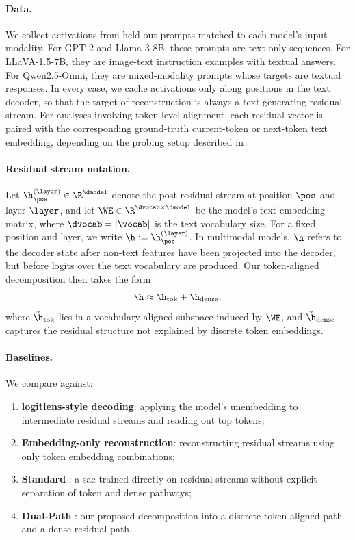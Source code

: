 \documentclass{article}
\begin{document}
\paragraph{Data.}
We collect activations from held-out prompts matched to each model's input modality. For GPT-2 and Llama-3-8B, these prompts are text-only sequences. For LLaVA-1.5-7B, they are image-text instruction examples with textual answers. For Qwen2.5-Omni, they are mixed-modality prompts whose targets are textual responses. In every case, we cache activations only along positions in the text decoder, so that the target of reconstruction is always a text-generating residual stream. For analyses involving token-level alignment, each residual vector is paired with the corresponding ground-truth current-token or next-token text embedding, depending on the probing setup described in .

\paragraph{Residual stream notation.}
Let $\h_{\pos}^{(\layer)} \in \R^{\dmodel}$ denote the post-residual stream at position $\pos$ and layer $\layer$, and let $\WE \in \R^{\dvocab \times \dmodel}$ be the model's text embedding matrix, where $\dvocab = |\vocab|$ is the text vocabulary size. For a fixed position and layer, we write $\h := \h_{\pos}^{(\layer)}$. In multimodal models, $\h$ refers to the decoder state after non-text features have been projected into the decoder, but before logits over the text vocabulary are produced. Our token-aligned decomposition then takes the form
\begin{equation}
  \h \approx \tilde{\h}_{\text{tok}} + \tilde{\h}_{\text{dense}},
\end{equation}
where $\tilde{\h}_{\text{tok}}$ lies in a vocabulary-aligned subspace induced by $\WE$, and $\tilde{\h}_{\text{dense}}$ captures the residual structure not explained by discrete token embeddings.

\paragraph{Baselines.}
We compare against:
\begin{enumerate}
  \item \textbf{\gls{logitlens}-style decoding}: applying the model's unembedding to intermediate residual streams and reading out top tokens;
  \item \textbf{Embedding-only reconstruction}: reconstructing residual streams using only token embedding combinations;
  \item \textbf{Standard }: a \gls{sae} trained directly on residual streams without explicit separation of token and dense pathways;
  \item \textbf{Dual-Path }: our proposed decomposition into a discrete token-aligned path and a dense residual path.
\end{enumerate}
\end{document}

